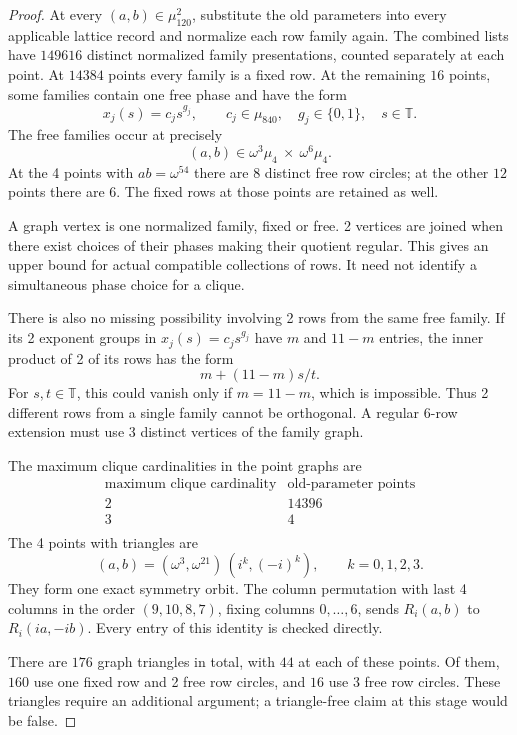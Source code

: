 \documentclass[11pt,a4paper]{article}
\theoremstyle{plain}
\theoremstyle{definition}
\theoremstyle{plain}
\begin{document}
\begin{proof}
\medskip
At every $(a,b)\in\mu_{120}^2$, substitute the old parameters into every applicable lattice record and normalize each row family again. The combined lists have $149616$ distinct normalized family presentations, counted separately at each point. At $14384$ points every family is a fixed row. At the remaining $16$ points, some families contain one free phase and have the form
\[
x_j(s)=c_j s^{g_j},\qquad
c_j\in\mu_{840},\quad g_j\in\{0,1\},\quad s\in\mathbb T.
\]
The free families occur at precisely
\[
(a,b)\in\omega^{3}\mu_4\ \times\ \omega^{6}\mu_4.
\]
At the 4 points with $ab=\omega^{54}$ there are 8 distinct free row circles; at the other $12$ points there are 6. The fixed rows at those points are retained as well.

A graph vertex is one normalized family, fixed or free. 2 vertices are joined when there exist choices of their phases making their quotient regular. This gives an upper bound for actual compatible collections of rows. It need not identify a simultaneous phase choice for a clique.

There is also no missing possibility involving 2 rows from the same free family. If its 2 exponent groups in $x_j(s)=c_js^{g_j}$ have $m$ and $11-m$ entries, the inner product of 2 of its rows has the form
$$m+(11-m)s/t.$$
For $s,t\in\mathbb T$, this could vanish only if $m=11-m$, which is impossible. Thus 2 different rows from a single family cannot be orthogonal. A regular 6-row extension must use 3 distinct vertices of the family graph.

The maximum clique cardinalities in the point graphs are
\[
\begin{array}{c|r}
\text{maximum clique cardinality}&\text{old-parameter points}\\\hline
2&14396\\
3&4\\
\end{array}
\]
The 4 points with triangles are
\[
(a,b)=(\omega^{3},\omega^{21})\,(i^k,(-i)^k),\qquad k=0,1,2,3.
\]
They form one exact symmetry orbit. The column permutation with last 4 columns in the order $(9,10,8,7)$, fixing columns $0,\ldots,6$, sends $R_i(a,b)$ to $R_i(ia,-ib)$. Every entry of this identity is checked directly.

There are $176$ graph triangles in total, with $44$ at each of these points. Of them, $160$ use one fixed row and 2 free row circles, and $16$ use 3 free row circles. These triangles require an additional argument; a triangle-free claim at this stage would be false.


\end{proof}
\end{document}
